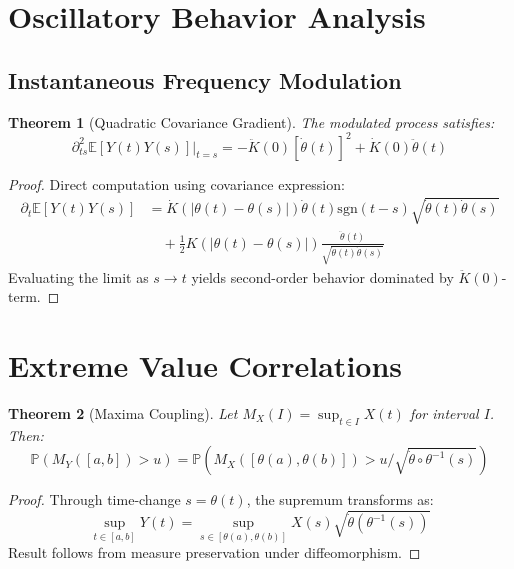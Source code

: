\documentclass{article}
\newtheorem{theorem}{Theorem}
\begin{document}
\section{Oscillatory Behavior Analysis}

\subsection{Instantaneous Frequency Modulation}

\begin{theorem}[Quadratic Covariance Gradient]
The modulated process satisfies:
\begin{equation*}
\partial^2_{ts} \mathbb{E}[Y(t)Y(s)]|_{t=s} = -\ddot{K}(0)[\dot{\theta}(t)]^2 + \dot{K}(0)\ddot{\theta}(t)
\end{equation*}
\end{theorem}

\begin{proof}
Direct computation using covariance expression:
\begin{align*}
\partial_t \mathbb{E}[Y(t)Y(s)] &= \dot{K}(|\theta(t)-\theta(s)|)\dot{\theta}(t)\text{sgn}(t-s)\sqrt{\dot{\theta}(t)\dot{\theta}(s)} \\
&\quad + \frac{1}{2}K(|\theta(t)-\theta(s)|)\frac{\ddot{\theta}(t)}{\sqrt{\dot{\theta}(t)\dot{\theta}(s)}}
\end{align*}
Evaluating the limit as $s \to t$ yields second-order behavior dominated by $\ddot{K}(0)$-term.
\end{proof}

\section{Extreme Value Correlations}

\begin{theorem}[Maxima Coupling]
Let $M_X(I) = \sup_{t \in I}X(t)$ for interval $I$. Then:
\begin{equation*}
\mathbb{P}(M_Y([a,b]) > u) = \mathbb{P}\left(M_X([\theta(a),\theta(b)]) > u/\sqrt{\dot{\theta}\circ\theta^{-1}(s)}\right)
\end{equation*}
\end{theorem}

\begin{proof}
Through time-change $s = \theta(t)$, the supremum transforms as:
\begin{equation*}
\sup_{t \in [a,b]} Y(t) = \sup_{s \in [\theta(a),\theta(b)]} X(s)\sqrt{\dot{\theta}(\theta^{-1}(s))}
\end{equation*}
Result follows from measure preservation under diffeomorphism.
\end{proof}
\end{document}
